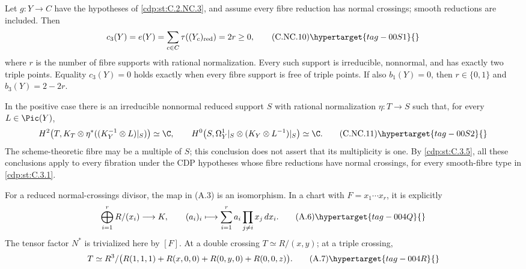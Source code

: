 
\begin{proposition}\hypertarget{tag-01CC}{}\label{cdp:st:C.2.NC.5}


Let $g:Y\to C$ have the hypotheses of \ref{cdp:st:C.2.NC.3}, and assume every fibre reduction has normal crossings; smooth reductions are included. Then
\[
 c_3(Y)=e(Y)=\sum_{c\in C}\tau((Y_c)_{\rm red})=2r\ge0,
 \tag{C.NC.10}\hypertarget{tag-00S1}{}\label{cdp:eq:C.NC.10}
\]
where $r$ is the number of fibre supports with rational normalization. Every such support is irreducible, nonnormal, and has exactly two triple points. Equality $c_3(Y)=0$ holds exactly when every fibre support is free of triple points. If also $b_1(Y)=0$, then $r\in\{0,1\}$ and $b_3(Y)=2-2r$.

In the positive case there is an irreducible nonnormal reduced support $S$ with rational normalization $\eta:T\to S$ such that, for every $L\in\Pic(Y)$,
\[
 H^2\!\left(T,K_T\otimes\eta^*((K_Y^{-1}\otimes L)|_S)\right)\simeq\C,
 \qquad
 H^0\!\left(S,\Omega_Y^1|_S\otimes(K_Y\otimes L^{-1})|_S\right)\simeq\C.
 \tag{C.NC.11}\hypertarget{tag-00S2}{}\label{cdp:eq:C.NC.11}
\]
The scheme-theoretic fibre may be a multiple of $S$; this conclusion does not assert that its multiplicity is one. By \ref{cdp:st:C.3.5}, all these conclusions apply to every fibration under the CDP hypotheses whose fibre reductions have normal crossings, for every smooth-fibre type in \ref{cdp:st:C.3.1}.
\end{proposition}

\begin{proposition}\hypertarget{tag-01AE}{}\label{cdp:st:A.1.2}


For a reduced normal-crossings divisor, the map in (A.3) is an isomorphism. In a chart with $F=x_1\cdots x_r$, it is explicitly
\[
 \bigoplus_{i=1}^r R/(x_i)\longrightarrow K,
 \qquad (a_i)_i\longmapsto
 \sum_{i=1}^r a_i\prod_{j\ne i}x_j\,dx_i.
\tag{A.6}\hypertarget{tag-004Q}{}\label{cdp:eq:A.6}
\]
The tensor factor $N^*$ is trivialized here by $[F]$. At a double crossing $T\simeq R/(x,y)$; at a triple crossing,
\[
 T\simeq R^3/\bigl(R(1,1,1)+R(x,0,0)+R(0,y,0)+R(0,0,z)\bigr).
\tag{A.7}\hypertarget{tag-004R}{}\label{cdp:eq:A.7}
\]
\end{proposition}

